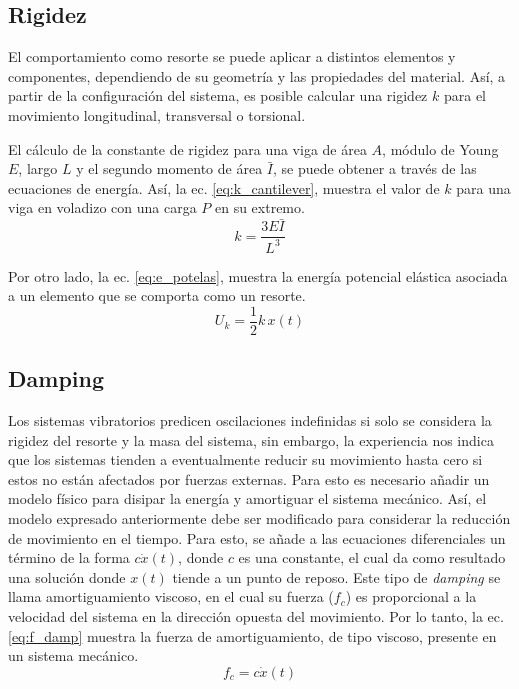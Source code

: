\subsection{Rigidez}
El comportamiento como resorte se puede aplicar a distintos elementos y componentes, dependiendo de su geometría y las propiedades del material. Así, a partir de la configuración del sistema, es posible calcular una rigidez $k$ para el movimiento longitudinal, transversal o torsional. 

El cálculo de la constante de rigidez para una viga de área $A$, módulo de Young $E$, largo $L$ y el segundo momento de área $\bar{I}$, se puede obtener a través de las ecuaciones de energía. Así, la ec. \ref{eq:k_cantilever}, muestra el valor de $k$ para una viga en voladizo con una carga $P$ en su extremo.
\begin{equation}\label{eq:k_cantilever}
	k = \frac{3E\bar{I}}{L^3}
\end{equation}

Por otro lado, la ec. \ref{eq:e_potelas}, muestra la energía potencial elástica asociada a un elemento que se comporta como un resorte.
\begin{equation}\label{eq:e_potelas}
	U_k = \frac{1}{2}k\,x(t)
\end{equation}


\subsection{Damping}
\label{sec:damping}
Los sistemas vibratorios predicen oscilaciones indefinidas si solo se considera la rigidez del resorte y la masa del sistema, sin embargo, la experiencia nos indica que los sistemas tienden a eventualmente reducir su movimiento hasta cero si estos no están afectados por fuerzas externas. Para esto es necesario añadir un modelo físico para disipar la energía y amortiguar el sistema mecánico. Así, el modelo expresado anteriormente debe ser modificado para considerar la reducción de movimiento en el tiempo. Para esto, se añade a las ecuaciones diferenciales un término de la forma $c\dot{x}(t)$, donde $c$ es una constante, el cual da como resultado una solución donde $x(t)$ tiende a un punto de reposo. Este tipo de \textit{damping} se llama amortiguamiento viscoso, en el cual su fuerza ($f_c$) es proporcional a la velocidad del sistema en la dirección opuesta del movimiento. Por lo tanto, la ec. \ref{eq:f_damp} muestra la fuerza de amortiguamiento, de tipo viscoso, presente en un sistema mecánico.
\begin{equation}\label{eq:f_damp}
	f_c = c\dot{x}(t)
\end{equation}


